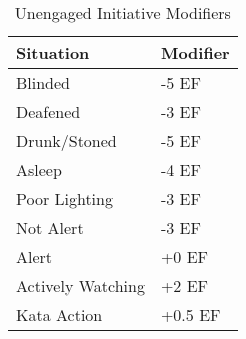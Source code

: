 \begin{table}[h]
\centering
\caption{Unengaged Initiative Modifiers}\label{tab:UnengagedInitiativeMods}
	\begin{tabular}{||l|l||} \hline
    Situation				&  Modifier \\ \hline
	Blinded                 &  -5 EF \\
	Deafened                &  -3 EF \\
	Drunk/Stoned            &  -5 EF \\
	Asleep                  &  -4 EF \\
	Poor Lighting           &  -3 EF \\
	Not Alert 				&  -3 EF \\
        Alert			&  +0 EF \\
	Actively Watching		& +2 EF \\
        Kata Action             &  +0.5 EF \\ \hline
	\end{tabular}
\end{table}
